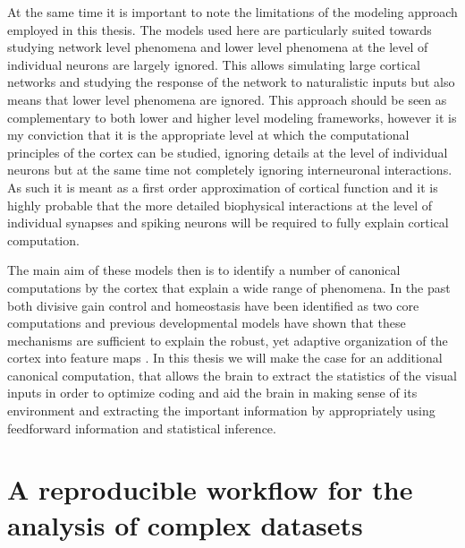 At the same time it is important to note the limitations of the
modeling approach employed in this thesis. The models used here are
particularly suited towards studying network level phenomena and lower
level phenomena at the level of individual neurons are largely
ignored. This allows simulating large cortical networks and studying
the response of the network to naturalistic inputs but also means that
lower level phenomena are ignored. This approach should be seen as
complementary to both lower and higher level modeling frameworks,
however it is my conviction that it is the appropriate level at which
the computational principles of the cortex can be studied, ignoring
details at the level of individual neurons but at the same time not
completely ignoring interneuronal interactions. As such it is meant as
a first order approximation of cortical function and it is highly
probable that the more detailed biophysical interactions at the level
of individual synapses and spiking neurons will be required to fully
explain cortical computation.

The main aim of these models then is to identify a number of canonical
computations by the cortex that explain a wide range of phenomena. In
the past both divisive gain control \citep{Carandini2012} and
homeostasis \citep{Marder2006} have been identified as two core
computations and previous developmental models have shown that these
mechanisms are sufficient to explain the robust, yet adaptive
organization of the cortex into feature maps \citep{Stevens2013}. In
this thesis we will make the case for an additional canonical
computation, that allows the brain to extract the statistics of the
visual inputs in order to optimize coding and aid the brain in making
sense of its environment and extracting the important information by
appropriately using feedforward information and statistical inference.

\section{A reproducible workflow for the analysis of complex datasets}

